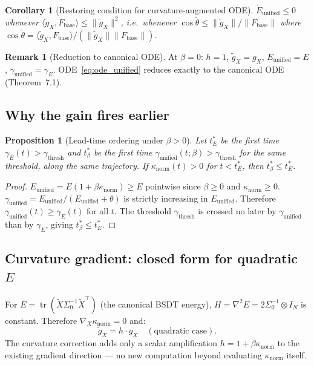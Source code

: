 \documentclass[11pt,a4paper]{article}
\newtheorem{proposition}[theorem]{Proposition}
\newtheorem{corollary}[theorem]{Corollary}
\theoremstyle{definition}
\newtheorem{remark}[theorem]{Remark}
\newcommand{\Fbase}{F_{\mathrm{base}}}
\begin{document}
\begin{corollary}[Restoring condition for curvature-augmented ODE]
\label{cor:restoring_unified}
$\dot E_\mathrm{unified} \leq 0$ whenever
$\langle\tilde g_X,\Fbase\rangle \leq \|\tilde g_X\|^2$,
i.e.\ whenever $\cos\tilde\theta \leq \|\tilde g_X\|/\|\Fbase\|$
where $\cos\tilde\theta = \langle\tilde g_X,\Fbase\rangle/(\|\tilde g_X\|\|\Fbase\|)$.
\end{corollary}

\begin{remark}[Reduction to canonical ODE]
At $\beta = 0$: $h = 1$, $\tilde g_X = g_X$,
$E_\mathrm{unified} = E$, $\gamma_\mathrm{unified} = \gamma_E$.
ODE~\eqref{eq:ode_unified} reduces exactly to the canonical ODE
(Theorem~7.1).
\end{remark}

\subsection{Why the gain fires earlier}

\begin{proposition}[Lead-time ordering under $\beta > 0$]
\label{prop:lead_time_beta}
Let $t_E^*$ be the first time $\gamma_E(t) > \gamma_\mathrm{thresh}$
and $t_\beta^*$ be the first time $\gamma_\mathrm{unified}(t;\beta) > \gamma_\mathrm{thresh}$
for the same threshold, along the same trajectory.
If $\kappa_\mathrm{norm}(t) > 0$ for $t < t_E^*$, then $t_\beta^* \leq t_E^*$.
\end{proposition}

\begin{proof}
$E_\mathrm{unified} = E(1+\beta\kappa_\mathrm{norm}) \geq E$ pointwise
since $\beta \geq 0$ and $\kappa_\mathrm{norm} \geq 0$.
$\gamma_\mathrm{unified} = E_\mathrm{unified}/(E_\mathrm{unified}+\theta)$
is strictly increasing in $E_\mathrm{unified}$.
Therefore $\gamma_\mathrm{unified}(t) \geq \gamma_E(t)$ for all $t$.
The threshold $\gamma_\mathrm{thresh}$ is crossed no later by $\gamma_\mathrm{unified}$
than by $\gamma_E$, giving $t_\beta^* \leq t_E^*$.
\end{proof}

\subsection{Curvature gradient: closed form for quadratic $E$}

For $E = \operatorname{tr}(\tilde X\Sigma_0^{-1}\tilde X^\top)$
(the canonical BSDT energy), $H = \nabla^2 E = 2\Sigma_0^{-1}\otimes I_N$
is constant. Therefore $\nabla_X\kappa_\mathrm{norm} = 0$ and:
\[
\tilde g_X = h\cdot g_X \quad (\text{quadratic case}).
\]
The curvature correction adds only a scalar amplification $h = 1+\beta\kappa_\mathrm{norm}$
to the existing gradient direction --- no new computation beyond
evaluating $\kappa_\mathrm{norm}$ itself.
\end{document}
